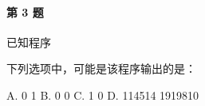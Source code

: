 \paragraph{第 3 题} 已知程序



下列选项中，可能是该程序输出的是：

A. 0 1 \quad
B. 0 0 \quad
C. 1 0 \quad
D. 114514 1919810 \quad
